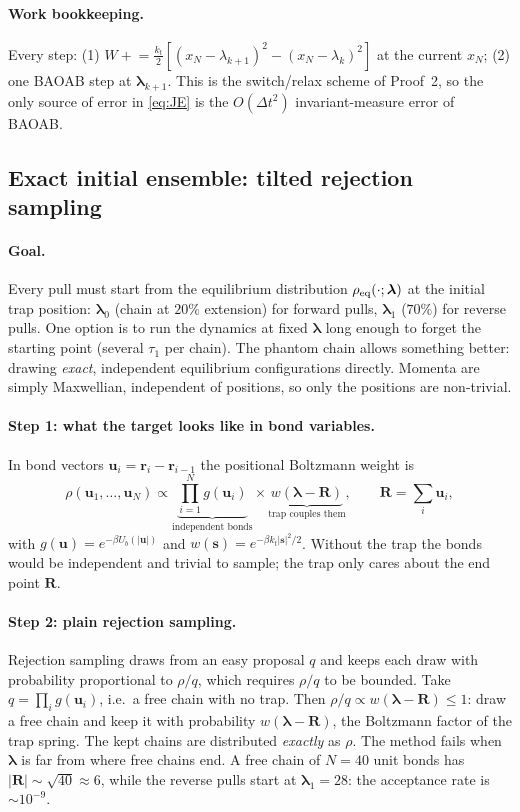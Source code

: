 \documentclass[11pt,a4paper]{article}
\newcommand{\lam}{\bm{\lambda}}
\begin{document}
\paragraph{Work bookkeeping.} Every step: (1)
$W\mathrel{+}=\tfrac{k_t}{2}[(x_N-\lambda_{k+1})^2-(x_N-\lambda_k)^2]$ at the current $x_N$; (2) one BAOAB step at
$\lam_{k+1}$. This is the switch/relax scheme of Proof~2, so the only source of error in
\eqref{eq:JE} is the $O(\Delta t^2)$ invariant-measure error of BAOAB.

\subsection{Exact initial ensemble: tilted rejection sampling}
\label{sec:tilt}

\paragraph{Goal.} Every pull must start from the equilibrium distribution $\rho_{\rm eq}(\cdot;\lam)$ at the
initial trap position: $\lam_0$ (chain at $20\%$ extension) for forward pulls, $\lam_1$ ($70\%$) for
reverse pulls. One option is to run the dynamics at fixed $\lam$ long enough to forget the starting
point (several $\tau_1$ per chain). The phantom chain allows something better: drawing \emph{exact},
independent equilibrium configurations directly. Momenta are simply Maxwellian, independent of
positions, so only the positions are non-trivial.

\paragraph{Step 1: what the target looks like in bond variables.} In bond vectors
$\bm u_i=\bm r_i-\bm r_{i-1}$ the positional Boltzmann weight is
\begin{equation}
\rho(\bm u_1,\dots,\bm u_N)\propto\underbrace{\prod_{i=1}^Ng(\bm u_i)}_{\text{independent bonds}}\times
\underbrace{w(\lam-\bm R)}_{\text{trap couples them}},\qquad \bm R=\sum_i\bm u_i,
\end{equation}
with $g(\bm u)=e^{-\beta U_b(|\bm u|)}$ and $w(\bm s)=e^{-\beta k_t|\bm s|^2/2}$. Without the trap the bonds
would be independent and trivial to sample; the trap only cares about the end point $\bm R$.

\paragraph{Step 2: plain rejection sampling.} Rejection sampling draws from an easy proposal $q$ and
keeps each draw with probability proportional to $\rho/q$, which requires $\rho/q$ to be bounded.
Take $q=\prod_ig(\bm u_i)$, i.e.\ a free chain with no trap. Then $\rho/q\propto w(\lam-\bm R)\le1$: draw a free
chain and keep it with probability $w(\lam-\bm R)$, the Boltzmann factor of the trap spring. The kept chains
are distributed \emph{exactly} as $\rho$. The method fails when $\lam$ is far from where free chains
end. A free chain of $N=40$ unit bonds has $|\bm R|\sim\sqrt{40}\approx6$, while the reverse pulls start
at $\lam_1=28$: the acceptance rate is $\sim10^{-9}$.
\end{document}
